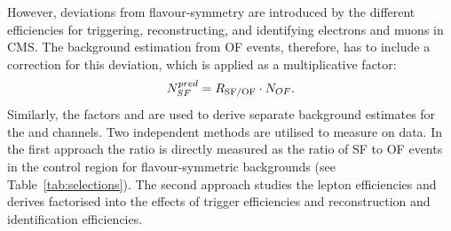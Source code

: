 However, deviations from flavour-symmetry are introduced by the different efficiencies for triggering, reconstructing, and identifying electrons and muons in CMS. The background estimation from OF events, therefore, has to include a correction for this deviation, which is applied as a multiplicative factor:
\begin{equation*}
N_{SF}^{pred} = R_{\text{SF/OF}} \cdot N_{OF}.
\end{equation*}
Similarly, the factors \Reeof and \Rmmof are used to derive separate background estimates for the \EE and \MM channels. Two independent methods are utilised to measure \Rsfof on data. In the first approach the ratio is directly measured as the ratio of SF to OF events in the control region for flavour-symmetric backgrounds (see Table~\ref{tab:selections}). The second approach studies the lepton efficiencies and derives \Rsfof factorised into the effects of trigger efficiencies and reconstruction and identification efficiencies. 

